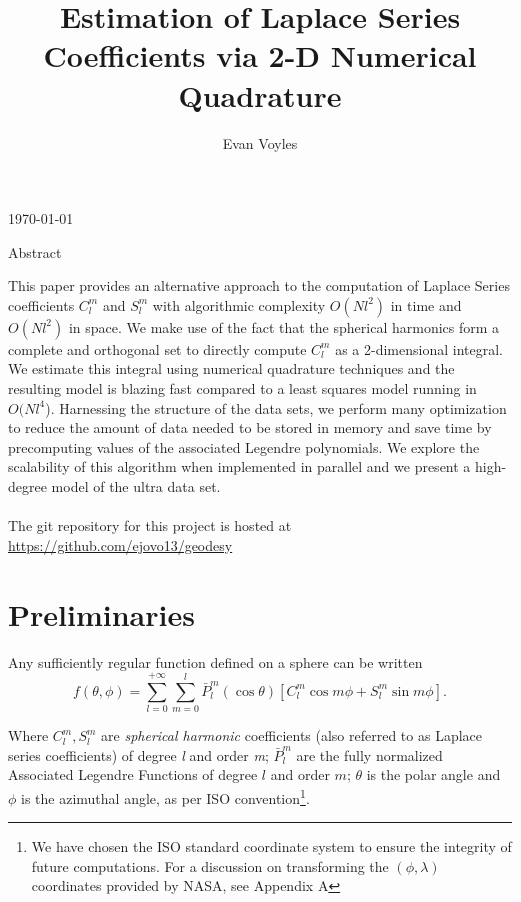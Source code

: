 \documentclass[a4paper]{article}
\title{\Large Estimation of Laplace Series Coefficients via 2-D Numerical Quadrature}
\author{Evan Voyles}
\date{}
\theoremstyle{definition}
\begin{document}
\makeatletter
\maketitle
\begin{center}
    \vspace{-.2in}
    \today
\end{center}
\makeatother

\newenvironment{norm}{
    \normalfont
}



\section{Abstract}

This paper provides an alternative approach to the computation of Laplace Series coefficients 
$C_l^m$ and $S_l^m$ with algorithmic complexity $O(Nl^2)$ in time and $O(Nl^2)$ in space. We 
make use of the fact that the spherical harmonics form a complete and orthogonal set to directly
compute $C_l^m$ as a 2-dimensional integral. We estimate this integral using numerical quadrature techniques
and the resulting model is blazing fast compared to a least squares model running in $O(Nl^4$). Harnessing the structure of the 
data sets, we perform many optimization to reduce the amount of data needed to be stored in memory and save time by precomputing values of the 
associated Legendre polynomials. We explore the scalability of this algorithm when implemented in parallel and we present a high-degree model of the
ultra data set.\\
\\
\noindent The git repository for this project is hosted at \href{https://github.com/ejovo13/geodesy}{https://github.com/ejovo13/geodesy}


\section{Preliminaries}

Any sufficiently regular function defined on a sphere can be written
\begin{equation} \label{eq:f_iso}
    f(\theta, \phi) = \sum_{l = 0}^{+\infty}\sum_{m = 0}^l \bar P_l^m(\cos\theta)[C_l^m\cos m\phi + S_l^m \sin m \phi].
\end{equation}

Where $C_l^m, S_l^m$ are \textit{spherical harmonic} coefficients (also referred to as Laplace series coefficients) of 
degree \textit{l} and order \textit{m}; $\bar P_l^m$ are the fully normalized Associated Legendre Functions of degree $l$ and order $m$;
$\theta$ is the polar angle and $\phi$ is the azimuthal angle, as per ISO convention\footnote{We have chosen the ISO standard coordinate system to 
ensure the integrity of future computations. For a discussion on transforming the $(\phi, \lambda)$ coordinates provided by NASA, see Appendix A}.
\end{document}
